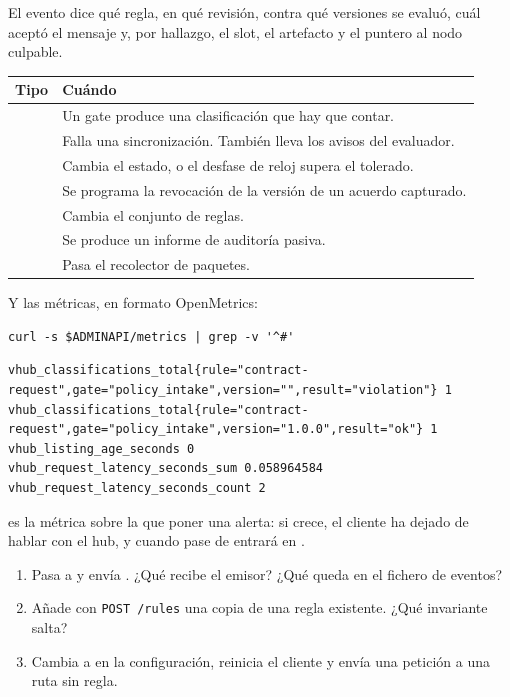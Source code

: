 El evento dice qué regla, en qué revisión, contra qué versiones se evaluó, cuál aceptó el mensaje y, por
hallazgo, el slot, el artefacto y el puntero al nodo culpable.

\noindent\begin{tabularx}{\linewidth}{@{}L{3cm}Y@{}}
\toprule
\textbf{Tipo} & \textbf{Cuándo} \\
\midrule
{} & Un gate produce una clasificación que hay que contar. \\
 & Falla una sincronización. También lleva los avisos del evaluador. \\
 & Cambia el estado, o el desfase de reloj supera el tolerado. \\
 & Se programa la revocación de la versión de un acuerdo capturado. \\
 & Cambia el conjunto de reglas. \\
 & Se produce un informe de auditoría pasiva. \\
 & Pasa el recolector de paquetes. \\
\bottomrule
\end{tabularx}

\medskip
Y las métricas, en formato OpenMetrics:

\begin{lstlisting}[style=sh]
curl -s $ADMINAPI/metrics | grep -v '^#'
\end{lstlisting}
\begin{lstlisting}[style=out]
vhub_classifications_total{rule="contract-request",gate="policy_intake",version="",result="violation"} 1
vhub_classifications_total{rule="contract-request",gate="policy_intake",version="1.0.0",result="ok"} 1
vhub_listing_age_seconds 0
vhub_request_latency_seconds_sum 0.058964584
vhub_request_latency_seconds_count 2
\end{lstlisting}

 es la métrica sobre la que poner una alerta: si crece, el cliente ha dejado de
hablar con el hub, y cuando pase de  entrará en .

\begin{retos}
\begin{enumerate}[leftmargin=*, itemsep=2pt]
  \item Pasa  a  y envía . ¿Qué recibe el emisor? ¿Qué queda
        en el fichero de eventos?
  \item Añade con \texttt{POST /\allowbreak{}rules} una copia de una regla existente. ¿Qué invariante salta?
  \item Cambia  a  en la configuración, reinicia el cliente y envía una petición
        a una ruta sin regla.
\end{enumerate}
\end{retos}

